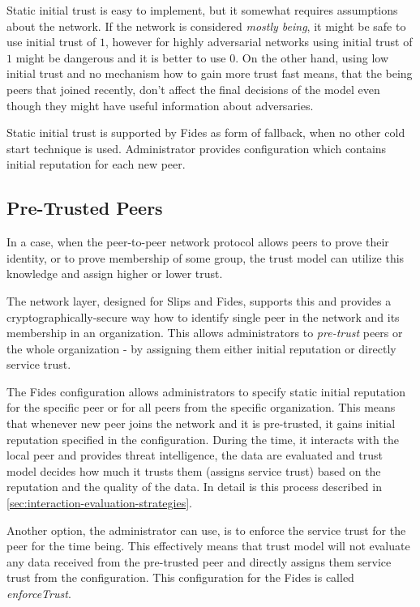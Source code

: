 Static initial trust is easy to implement, but it somewhat requires assumptions about the network. If the network is considered \textit{mostly being}, it might be safe to use initial trust of $1$, however for highly adversarial networks using initial trust of $1$ might be dangerous and it is better to use $0$. 
On the other hand, using low initial trust and no mechanism how to gain more trust fast means, that the being peers that joined recently, don't affect the final decisions of the model even though they might have useful information about adversaries.

Static initial trust is supported by Fides as form of fallback, when no other cold start technique is used. Administrator provides configuration which contains initial reputation for each new peer.

\subsection{Pre-Trusted Peers}
\label{subsec:pre-trusted-peers}
In a case, when the peer-to-peer network protocol allows peers to prove their identity, or to prove membership of some group, the trust model can utilize this knowledge and assign higher or lower trust.

The network layer, designed for Slips and Fides, supports this\cite{nl} and provides a cryptographically-secure way how to identify single peer in the network and its membership in an organization.
This allows administrators to \textit{pre-trust} peers or the whole organization - by assigning them either initial reputation or directly service trust.

The Fides configuration allows administrators to specify static initial reputation for the specific peer or for all peers from the specific organization. 
This means that whenever new peer joins the network and it is pre-trusted, it gains initial reputation specified in the configuration.
During the time, it interacts with the local peer and provides threat intelligence, the data are evaluated and trust model decides how much it trusts them (assigns service trust) based on the reputation and the quality of the data. In detail is this process described in \ref{sec:interaction-evaluation-strategies}.

Another option, the administrator can use, is to enforce the service trust for the peer for the time being. This effectively means that trust model will not evaluate any data received from the pre-trusted peer and directly assigns them service trust from the configuration. This configuration for the Fides is called \textit{enforceTrust}.

